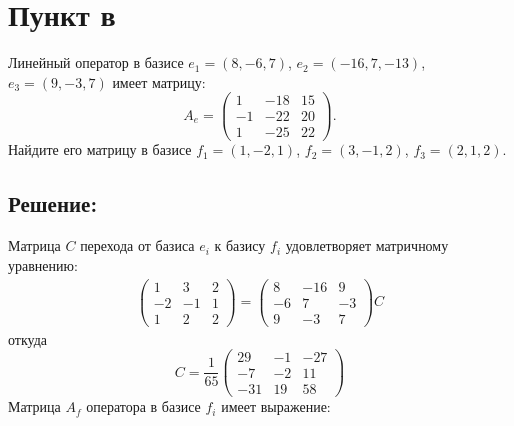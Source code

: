 \documentclass[12pt]{article}
\begin{document}
    \section*{Пункт в}
    Линейный оператор в базисе $e_1 = ( 8, -6, 7 )$, $e_2 = ( -16, 7, -13 )$, $e_3 = ( 9, -3, 7 )$ имеет матрицу:
    \[
        A_e =
        \begin{pmatrix}
            1  & - 18 & 15 \\
            -1 & -22  & 20 \\
            1  & -25  & 22
        \end{pmatrix}
        .
    \]
    Найдите его матрицу в базисе $f_1 = ( 1, -2, 1 )$, $f_2 = ( 3, -1, 2 )$, $f_3 = ( 2, 1, 2 )$.

    \subsection*{Решение:}
    Матрица $C$ перехода от базиса $e_i$ к базису $f_i$ удовлетворяет матричному уравнению:
    \begin{gather*}
        \begin{pmatrix}
            1  & 3  & 2 \\
            -2 & -1 & 1 \\
            1  & 2  & 2
        \end{pmatrix}
        =
        \begin{pmatrix}
            8  & -16 & 9  \\
            -6 & 7   & -3 \\
            9  & -3  & 7
        \end{pmatrix}
        C
    \end{gather*}
    откуда
    \[
        C =
        \frac{1}{65}
        \begin{pmatrix}
            29  & -1 & -27 \\
            -7  & -2 & 11  \\
            -31 & 19 & 58
        \end{pmatrix}
    \]
    Матрица $A_f$ оператора в базисе $f_i$ имеет выражение:
\end{document}

